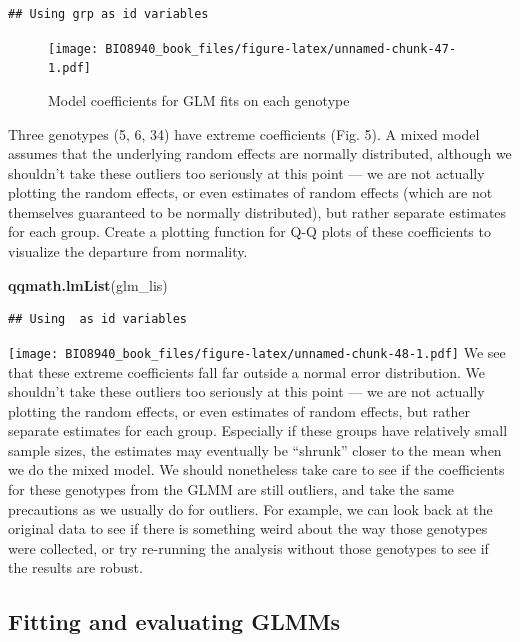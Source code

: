 \documentclass[
  12pt,
]{book}
\newenvironment{Shaded}{\begin{snugshade}}{\end{snugshade}}
\newcommand{\KeywordTok}[1]{\textcolor[rgb]{0.13,0.29,0.53}{\textbf{#1}}}
\newcommand{\NormalTok}[1]{#1}
\begin{document}
\begin{verbatim}
## Using grp as id variables
\end{verbatim}

\begin{figure}
\centering
\texttt{[image: BIO8940\_book\_files/figure-latex/unnamed-chunk-47-1.pdf]}
\caption{\label{fig:unnamed-chunk-47}Model coefficients for GLM fits on each genotype}
\end{figure}

Three genotypes (5, 6, 34) have extreme coefficients (Fig. 5). A mixed model assumes that the underlying random effects are normally distributed, although we shouldn't take these outliers too seriously at this point --- we are not actually plotting the random effects, or even estimates of random effects (which are not themselves guaranteed to be normally distributed), but rather separate estimates for each group.
Create a plotting function for Q-Q plots of these coefficients to visualize the departure from normality.

\begin{Shaded}
\begin{Highlighting}[]
\KeywordTok{qqmath.lmList}\NormalTok{(glm_lis)}
\end{Highlighting}
\end{Shaded}

\begin{verbatim}
## Using  as id variables
\end{verbatim}

\texttt{[image: BIO8940\_book\_files/figure-latex/unnamed-chunk-48-1.pdf]}
We see that these extreme coefficients fall far outside a normal error distribution. We shouldn't take these outliers too seriously at this point --- we are not actually plotting the random effects, or even estimates of random effects, but rather separate estimates for each group.
Especially if these groups have relatively small sample sizes, the estimates may eventually be ``shrunk'' closer to the mean when we do the mixed model.
We should nonetheless take care to see if the coefficients for these genotypes from the GLMM are still outliers, and take the same precautions as we usually do for outliers. For example, we can look back at the original data to see if there is something weird about the way those genotypes were collected, or try re-running the analysis without those genotypes to see if the results are robust.

\hypertarget{fitting-and-evaluating-glmms}{%
\subsection{Fitting and evaluating GLMMs}\label{fitting-and-evaluating-glmms}}
\end{document}
